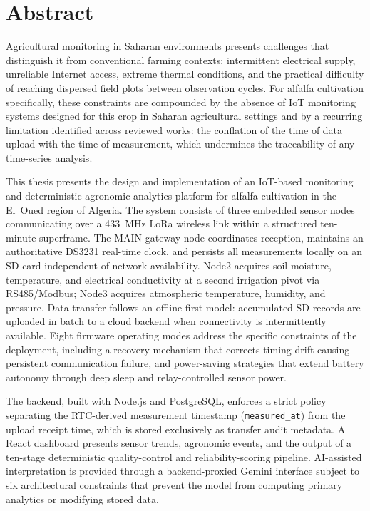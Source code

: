 
\chapter*{Abstract}

Agricultural monitoring in Saharan environments presents challenges that distinguish it
from conventional farming contexts: intermittent electrical supply, unreliable Internet
access, extreme thermal conditions, and the practical difficulty of reaching dispersed
field plots between observation cycles. For alfalfa cultivation specifically, these
constraints are compounded by the absence of IoT monitoring systems designed for this
crop in Saharan agricultural settings and by a recurring limitation identified across
reviewed works: the conflation of the time of data upload with the time of
measurement, which undermines the traceability of any time-series analysis.

This thesis presents the design and implementation of an IoT-based monitoring and
deterministic agronomic analytics platform for alfalfa cultivation in the El~Oued
region of Algeria. The system consists of three embedded sensor nodes communicating
over a 433~MHz LoRa wireless link within a structured ten-minute superframe. The MAIN
gateway node coordinates reception, maintains an authoritative DS3231 real-time clock,
and persists all measurements locally on an SD card independent of network
availability. Node2 acquires soil moisture, temperature, and electrical conductivity
at a second irrigation pivot via RS485/Modbus; Node3 acquires atmospheric temperature,
humidity, and pressure. Data transfer follows an offline-first model: accumulated SD
records are uploaded in batch to a cloud backend when connectivity is intermittently
available. Eight firmware operating modes address the specific constraints of the
deployment, including a recovery mechanism that corrects timing drift causing
persistent communication failure, and power-saving strategies that extend battery
autonomy through deep sleep and relay-controlled sensor power.

The backend, built with Node.js and PostgreSQL, enforces a strict policy separating
the RTC-derived measurement timestamp (\texttt{measured\_at}) from the upload receipt
time, which is stored exclusively as transfer audit metadata. A React dashboard
presents sensor trends, agronomic events, and the output of a ten-stage deterministic
quality-control and reliability-scoring pipeline. AI-assisted interpretation is
provided through a backend-proxied Gemini interface subject to six architectural
constraints that prevent the model from computing primary analytics or modifying stored
data.

